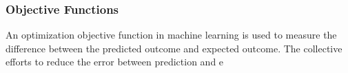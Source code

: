 \subsubsection{Objective Functions}
An optimization objective function in machine learning is used to measure the difference between the predicted outcome and expected outcome. The collective efforts to reduce the error between prediction and e
